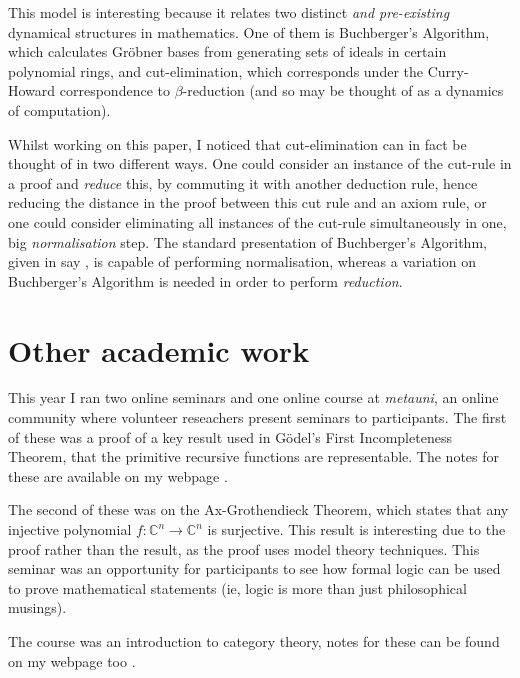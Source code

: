 \documentclass[12pt]{article}
\theoremstyle{plain}
\theoremstyle{definition}
\newcommand{\bb}[1]{\mathbb{#1}}
\newcommand{\lto}{\longrightarrow}
\begin{document}
	This model is interesting because it relates two distinct \emph{and pre-existing} dynamical structures in mathematics. One of them is Buchberger's Algorithm, which calculates Gr\"{o}bner bases from generating sets of ideals in certain polynomial rings, and cut-elimination, which corresponds under the Curry-Howard correspondence to $\beta$-reduction (and so may be thought of as a dynamics of computation).
	
	Whilst working on this paper, I noticed that cut-elimination can in fact be thought of in two different ways. One could consider an instance of the cut-rule in a proof and \emph{reduce} this, by commuting it with another deduction rule, hence reducing the distance in the proof between this cut rule and an axiom rule, or one could consider eliminating all instances of the cut-rule simultaneously in one, big \emph{normalisation} step. The standard presentation of Buchberger's Algorithm, given in say \cite{CLO}, is capable of performing normalisation, whereas a variation on Buchberger's Algorithm is needed in order to perform \emph{reduction}.
	
	\section{Other academic work}
	This year I ran two online seminars and one online course at \emph{metauni}, an online community where volunteer reseachers present seminars to participants. The first of these was a proof of a key result used in G\"{o}del's First Incompleteness Theorem, that the primitive recursive functions are representable. The notes for these are available on my webpage \cite{GI}.
	
	The second of these was on the Ax-Grothendieck Theorem, which states that any injective polynomial $f: \bb{C}^n \lto \bb{C}^n$ is surjective. This result is interesting due to the proof rather than the result, as the proof uses model theory techniques. This seminar was an opportunity for participants to see how formal logic can be used to prove mathematical statements (ie, logic is more than just philosophical musings).
	
	The course was an introduction to category theory, notes for these can be found on my webpage too \cite{SoC}.
	
	
	
	
	
	
	
	
	
	
	
	
	
\end{document}
